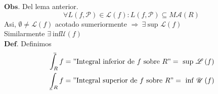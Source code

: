 \documentclass[10pt,a4paper]{article}
\def\upint{\mathchoice%
    {\mkern13mu\overline{\vphantom{\intop}\mkern7mu}\mkern-20mu}%
    {\mkern7mu\overline{\vphantom{\intop}\mkern7mu}\mkern-14mu}%
    {\mkern7mu\overline{\vphantom{\intop}\mkern7mu}\mkern-14mu}%
    {\mkern7mu\overline{\vphantom{\intop}\mkern7mu}\mkern-14mu}%
  \int}
\def\lowint{\mkern3mu\underline{\vphantom{\intop}\mkern7mu}\mkern-10mu\int}
\begin{document}
\newpage
\color{red} 
$\mathbf{Obs.}$
\color{black} 
Del lema anterior. 
$$ \forall L \left( f,\mathcal{P} \right) \in \mathscr{L} \left( f \right) : L \left( f , \mathcal{P} \right) \subseteq
 M \mathcal{A} \left( R \right)  $$
Asi, $ \emptyset \neq \mathscr{L} \left( f \right)  $ acotado sumeriormente 
$\Rightarrow \ \exists \ \text{sup } \mathscr{L} \left( f \right) $ \\
Similarmente $\exists \ \text{inf} \mathscr{U} \left( f \right)  $ \\
\color{red} 
$\mathbf{Def.}$
\color{black} 
Definimos 
\begin{gather*}
    \upint_R f = "\text{Integral inferior de } f \text{ sobre } R "= \text{ sup } \mathscr{L} \left( f \right)    \\
    \lowint_R f = "\text{Integral superior de } f \text{ sobre } R "= \text{ inf } \mathscr{U} \left( f \right)    \\ 
\end{gather*}
\end{document}
